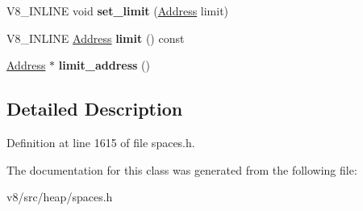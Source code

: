 \begin{DoxyCompactItemize}
V8\+\_\+\+I\+N\+L\+I\+NE void {\bfseries set\+\_\+limit} (\mbox{\hyperlink{classuintptr__t}{Address}} limit)
\item 
\mbox{\label{classv8_1_1internal_1_1LinearAllocationArea_a47fd03f7248720926ef80079829b01de}} 
V8\+\_\+\+I\+N\+L\+I\+NE \mbox{\hyperlink{classuintptr__t}{Address}} {\bfseries limit} () const
\item 
\mbox{\label{classv8_1_1internal_1_1LinearAllocationArea_ab9e2672781dff7e9446f3537d56f8016}} 
\mbox{\hyperlink{classuintptr__t}{Address}} $\ast$ {\bfseries limit\+\_\+address} ()
\end{DoxyCompactItemize}


\subsection{Detailed Description}


Definition at line 1615 of file spaces.\+h.



The documentation for this class was generated from the following file\+:\begin{DoxyCompactItemize}
\item 
v8/src/heap/spaces.\+h\end{DoxyCompactItemize}
